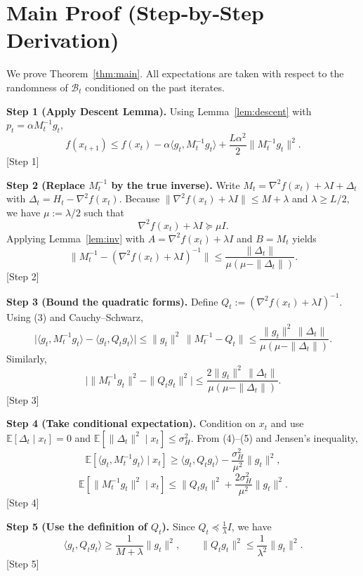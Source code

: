 \documentclass{article}
\newcommand{\E}{\mathbb{E}}
\begin{document}
\section*{Main Proof (Step‑by‑Step Derivation)}
We prove Theorem~\ref{thm:main}. All expectations are taken with respect to the randomness of $\mathcal{B}_{t}$ conditioned on the past iterates.

\noindent\textbf{Step 1 (Apply Descent Lemma).}  
Using Lemma~\ref{lem:descent} with $p_{t}=\alpha M_{t}^{-1}g_{t}$,
\[
f(x_{t+1})\le f(x_{t})-\alpha\langle g_{t},M_{t}^{-1}g_{t}\rangle
+\frac{L\alpha^{2}}{2}\|M_{t}^{-1}g_{t}\|^{2}.
\tag{2}
\]
[Step 1]

\noindent\textbf{Step 2 (Replace $M_{t}^{-1}$ by the true inverse).}  
Write $M_{t}= \nabla^{2}f(x_{t})+\lambda I +\Delta_{t}$ with $\Delta_{t}=H_{t}-\nabla^{2}f(x_{t})$.  
Because $\|\nabla^{2}f(x_{t})+\lambda I\|\le M+\lambda$ and $\lambda\ge L/2$, we have $\mu:=\lambda/2$ such that
\[
\nabla^{2}f(x_{t})+\lambda I\succeq \mu I.
\]
Applying Lemma~\ref{lem:inv} with $A=\nabla^{2}f(x_{t})+\lambda I$ and $B=M_{t}$ yields
\[
\|M_{t}^{-1}-(\nabla^{2}f(x_{t})+\lambda I)^{-1}\|
\le \frac{\|\Delta_{t}\|}{\mu(\mu-\|\Delta_{t}\|)}.
\tag{3}
\]
[Step 2]

\noindent\textbf{Step 3 (Bound the quadratic forms).}  
Define $Q_{t}:=(\nabla^{2}f(x_{t})+\lambda I)^{-1}$. Using (3) and Cauchy–Schwarz,
\[
\bigl|\langle g_{t},M_{t}^{-1}g_{t}\rangle-\langle g_{t},Q_{t}g_{t}\rangle\bigr|
\le \|g_{t}\|^{2}\,\|M_{t}^{-1}-Q_{t}\|
\le \frac{\|g_{t}\|^{2}\,\|\Delta_{t}\|}{\mu(\mu-\|\Delta_{t}\|)}.
\tag{4}
\]
Similarly,
\[
\bigl|\|M_{t}^{-1}g_{t}\|^{2}-\|Q_{t}g_{t}\|^{2}\bigr|
\le \frac{2\|g_{t}\|^{2}\,\|\Delta_{t}\|}{\mu(\mu-\|\Delta_{t}\|)}.
\tag{5}
\]
[Step 3]

\noindent\textbf{Step 4 (Take conditional expectation).}  
Condition on $x_{t}$ and use $\E[\Delta_{t}\mid x_{t}]=0$ and $\E[\|\Delta_{t}\|^{2}\mid x_{t}]\le\sigma_{H}^{2}$.  
From (4)–(5) and Jensen’s inequality,
\[
\E\!\left[\langle g_{t},M_{t}^{-1}g_{t}\rangle\mid x_{t}\right]
\ge \langle g_{t},Q_{t}g_{t}\rangle - \frac{\sigma_{H}^{2}}{\mu^{2}}\|g_{t}\|^{2},
\tag{6}
\]
\[
\E\!\left[\|M_{t}^{-1}g_{t}\|^{2}\mid x_{t}\right]
\le \|Q_{t}g_{t}\|^{2}+ \frac{2\sigma_{H}^{2}}{\mu^{2}}\|g_{t}\|^{2}.
\tag{7}
\]
[Step 4]

\noindent\textbf{Step 5 (Use the definition of $Q_{t}$).}  
Since $Q_{t}\preceq \frac{1}{\lambda}I$, we have
\[
\langle g_{t},Q_{t}g_{t}\rangle \ge \frac{1}{M+\lambda}\|g_{t}\|^{2},
\qquad
\|Q_{t}g_{t}\|^{2}\le \frac{1}{\lambda^{2}}\|g_{t}\|^{2}.
\tag{8}
\]
[Step 5]
\end{document}
